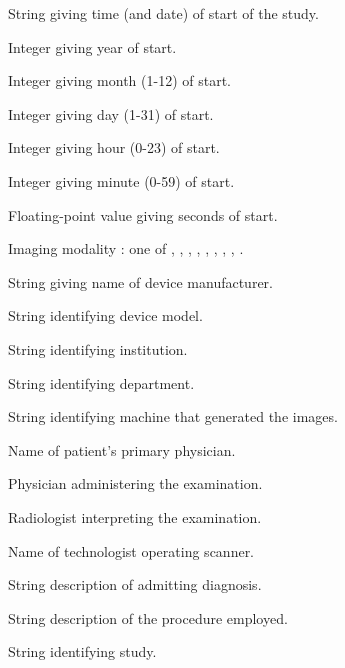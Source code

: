 \begin{description}
   \item [] String giving time (and date) of start
      of the study.
   \item [] Integer giving year of start.
   \item [] Integer giving month (1-12) of start.
   \item [] Integer giving day (1-31) of start.
   \item [] Integer giving hour (0-23) of start.
   \item [] Integer giving minute (0-59) of start.
   \item [] Floating-point value giving seconds
      of start.
   \item [] Imaging modality : one of ,
      , , ,
      , , , ,
      .
   \item [] String giving name of device
      manufacturer.
   \item [] String identifying device model.
   \item [] String identifying institution.
   \item [] String identifying department.
   \item [] String identifying machine that generated
      the images.
   \item [] Name of patient's primary
      physician.
   \item [] Physician administering the
      examination.
   \item [] Radiologist interpreting the examination.
   \item [] Name of technologist operating scanner.
   \item [] String description of admitting
      diagnosis. 
   \item [] String description of the procedure employed.
   \item [] String identifying study.
\end{description}


